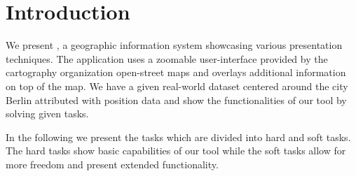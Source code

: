 \section*{Introduction}
We present , a geographic information system
showcasing various presentation techniques.
The application uses a zoomable user-interface provided
by the cartography organization open-street maps and overlays
additional information on top of the map.
We have a given real-world dataset centered around the city Berlin
attributed with position data and show the functionalities of
our tool by solving given tasks.

In the following we present the tasks which are divided into
hard and soft tasks. The hard tasks show basic capabilities
of our tool while the soft tasks allow for more freedom
and present extended functionality.
